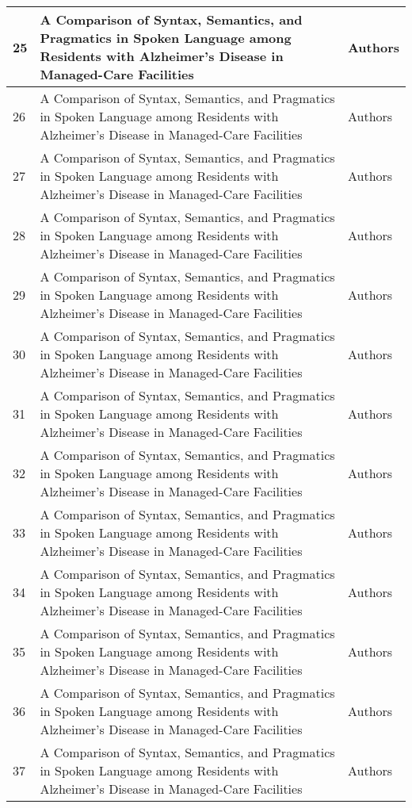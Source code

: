 \documentclass[12pt]{article}
\begin{document}
\begin{table}
\begin{tabular}{ p{1cm} | p{6cm} | p{6cm}}
	25 & A Comparison of Syntax, Semantics, and Pragmatics in Spoken Language among Residents with Alzheimer's Disease in Managed-Care Facilities & Authors \\ \hline
	26 & A Comparison of Syntax, Semantics, and Pragmatics in Spoken Language among Residents with Alzheimer's Disease in Managed-Care Facilities & Authors \\ \hline
	27 & A Comparison of Syntax, Semantics, and Pragmatics in Spoken Language among Residents with Alzheimer's Disease in Managed-Care Facilities & Authors \\ \hline
	28 & A Comparison of Syntax, Semantics, and Pragmatics in Spoken Language among Residents with Alzheimer's Disease in Managed-Care Facilities & Authors \\ \hline
	29 & A Comparison of Syntax, Semantics, and Pragmatics in Spoken Language among Residents with Alzheimer's Disease in Managed-Care Facilities & Authors \\ \hline
	30 & A Comparison of Syntax, Semantics, and Pragmatics in Spoken Language among Residents with Alzheimer's Disease in Managed-Care Facilities & Authors \\ \hline
	31 & A Comparison of Syntax, Semantics, and Pragmatics in Spoken Language among Residents with Alzheimer's Disease in Managed-Care Facilities & Authors \\ \hline
	32 & A Comparison of Syntax, Semantics, and Pragmatics in Spoken Language among Residents with Alzheimer's Disease in Managed-Care Facilities & Authors \\ \hline
	33 & A Comparison of Syntax, Semantics, and Pragmatics in Spoken Language among Residents with Alzheimer's Disease in Managed-Care Facilities & Authors \\ \hline
	34 & A Comparison of Syntax, Semantics, and Pragmatics in Spoken Language among Residents with Alzheimer's Disease in Managed-Care Facilities & Authors \\ \hline
	35 & A Comparison of Syntax, Semantics, and Pragmatics in Spoken Language among Residents with Alzheimer's Disease in Managed-Care Facilities & Authors \\ \hline
	36 & A Comparison of Syntax, Semantics, and Pragmatics in Spoken Language among Residents with Alzheimer's Disease in Managed-Care Facilities & Authors \\ \hline
	37 & A Comparison of Syntax, Semantics, and Pragmatics in Spoken Language among Residents with Alzheimer's Disease in Managed-Care Facilities & Authors \\ \hline

\end{tabular}
\end{table}
\end{document}
